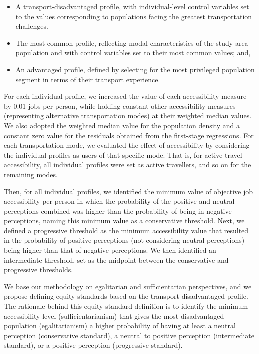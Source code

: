 \documentclass[preprint, 3p,
authoryear]{elsarticle} %
\begin{document}
\begin{itemize}
\item
  A transport-disadvantaged profile, with individual-level control
  variables set to the values corresponding to populations facing the
  greatest transportation challenges.
\item
  The most common profile, reflecting modal characteristics of the study
  area population and with control variables set to their most common
  values; and,
\item
  An advantaged profile, defined by selecting for the most privileged
  population segment in terms of their transport experience.
\end{itemize}

For each individual profile, we increased the value of each
accessibility measure by 0.01 jobs per person, while holding constant
other accessibility measures (representing alternative transportation
modes) at their weighted median values. We also adopted the weighted
median value for the population density and a constant zero value for
the residuals obtained from the first-stage regressions. For each
transportation mode, we evaluated the effect of accessibility by
considering the individual profiles as users of that specific mode. That
is, for active travel accessibility, all individual profiles were set as
active travellers, and so on for the remaining modes.

Then, for all individual profiles, we identified the minimum value of
objective job accessibility per person in which the probability of the
positive and neutral perceptions combined was higher than the
probability of being in negative perceptions, naming this minimum value
as a conservative threshold. Next, we defined a progressive threshold as
the minimum accessibility value that resulted in the probability of
positive perceptions (not considering neutral perceptions) being higher
than that of negative perceptions. We then identified an intermediate
threshold, set as the midpoint between the conservative and progressive
thresholds.

We base our methodology on egalitarian and sufficientarian perspectives,
and we propose defining equity standards based on the
transport-disadvantaged profile. The rationale behind this equity
standard definition is to identify the minimum accessibility level
(sufficientarianism) that gives the most disadvantaged population
(egalitarianism) a higher probability of having at least a neutral
perception (conservative standard), a neutral to positive perception
(intermediate standard), or a positive perception (progressive
standard).
\end{document}
